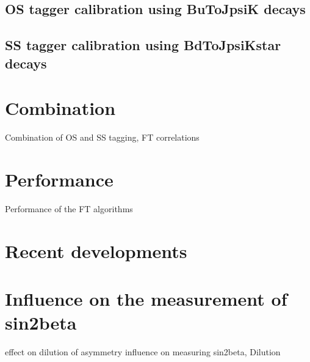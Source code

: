 \subsection{\ac{OS} tagger calibration using BuToJpsiK decays}
\label{sec:flavour_tagging:calibration:os}

\subsection{\ac{SS} tagger calibration using BdToJpsiKstar decays}
\label{sec:flavour_tagging:calibration:ss}

\section{Combination}
\label{sec:flavour_tagging:combination}
Combination of OS and SS tagging, FT correlations

\section{Performance}
\label{sec:flavour_tagging:performance}
Performance of the FT algorithms

\section{Recent developments}
\label{sec:flavour_tagging:developments}

\section{Influence on the measurement of sin2beta}
\label{sec:flavour_tagging:sin2beta}
effect on dilution of asymmetry
influence on measuring sin2beta, Dilution
